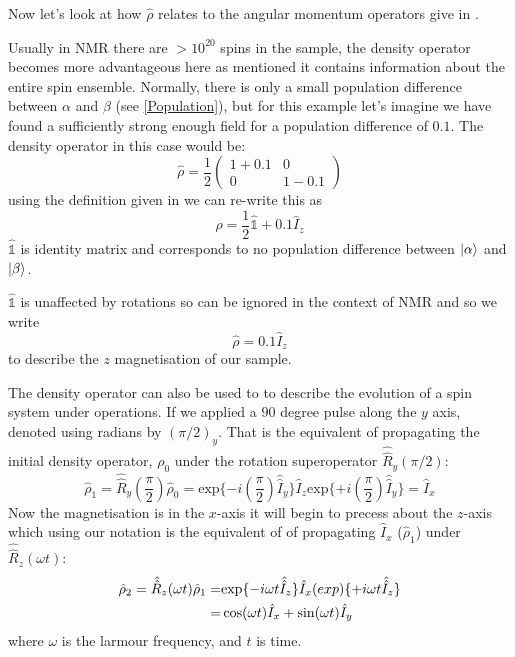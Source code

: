 Now let's look at how $\hat\rho$ relates to the angular momentum operators give in .

Usually in NMR there are $>10^{20}$ spins in the sample, the density operator becomes more advantageous here
as mentioned it contains information about the entire spin ensemble. Normally, there is only a small population difference between $\alpha$ and $\beta$ (see \ref{Population}),
but for this example let's imagine we have found a sufficiently strong enough field for a population difference of $0.1$. The density operator in this case would be:
\begin{equation}
  \hat\rho = \frac{1}{2}\begin{pmatrix}
    1 + 0.1 & 0\\
    0 & 1-0.1
\end{pmatrix}
\end{equation}
using the definition given in  we can re-write this as
\begin{equation}
  \hat\rho = \frac{1}{2}\hat{\mathbb{1}} + 0.1\hat{I}_z
\end{equation}
$\hat{\mathbb{1}}$ is identity matrix and corresponds to no population difference between $\ket{\alpha}$ and $\ket{\beta}$.

$\hat{\mathbb{1}}$ is unaffected by rotations so can be ignored in the context of NMR
and so we write
\begin{equation}
  \hat{\rho} = 0.1\hat{I}_z
\end{equation}
to describe the $z$ magnetisation of our sample.

The density operator can also be used to to describe the evolution of a spin system under operations. If we applied a $90$ degree pulse along the $y$ axis, denoted using radians by $(\pi/2)_y$. That is the equivalent of propagating the initial density operator, $\rho_0$
under the rotation superoperator $\hat{\hat{R}}_y(\pi/2)$:
\begin{equation}
  \hat{\rho}_1 = \hat{\hat{R}}_y(\frac{\pi}{2})\hat\rho_0 = \text{exp}\{-i(\frac{\pi}{2})\hat{\hat{I}}_y\}\hat{I}_z\text{exp}\{+i(\frac{\pi}{2})\hat{\hat{I}}_y\} = \hat{I}_x
\end{equation}
Now the magnetisation is in the $x$-axis it will begin to precess about the $z$-axis which using our notation is the equivalent of of propagating $\hat{I}_x$ ($\hat{\rho}_1$)
under $\hat{\hat{R}}_z(\omega t)$:
\begin{align}\label{eqn:propagate}
  \hat{\rho}_2 = \hat{\hat{R}}_z(\omega t)\hat{\rho}_1 =& \text{exp}\{-i\omega t\hat{\hat{I}}_z\}\hat{I}_x\text(exp)\{+i\omega t\hat{\hat{I}}_z\}\\
   =& \cos(\omega t)\hat{I}_x + \sin(\omega t)\hat{I}_y
\end{align}
where $\omega$ is the larmour frequency, and $t$ is time.

